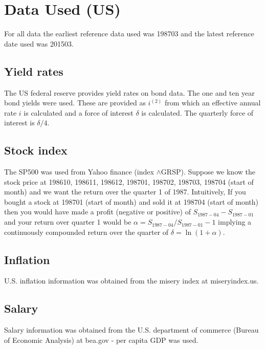 \documentclass[12pt]{article}
\begin{document}


\section{Data Used (US)}

For all data the earliest reference data used was 198703 and the latest
reference date used was 201503. 

\subsection{Yield rates}
The US federal reserve provides yield rates on bond data. The one and ten year
bond yields were used. These are provided as $i^{(2)}$ from which an effective
annual rate $i$ is calculated and a force of interest $\delta$ is calculated.
The quarterly force of interest is $\delta/4$.

\subsection{Stock index}
The SP500 was used from Yahoo finance (index $\wedge$GRSP). Suppose we know the stock price
at 198610, 198611, 198612, 198701, 198702, 198703, 198704 (start of month) and we want the return over the quarter 1 of 1987. Intuitively, If you bought a stock at 198701 (start of month) and sold it at 198704 (start of month) then you would have made a profit (negative or positive) of $S_{1987-04} - S_{1987-01}$ and your return over quarter 1 would be $\alpha = S_{1987-04}/S_{1987-01} - 1$ implying a continuously compounded return over the quarter of $\delta = \ln(1+\alpha)$.

\subsection{Inflation}
U.S. inflation information was obtained from the misery index at miseryindex.us.

\subsection{Salary}
Salary information was obtained from the U.S. department of commerce (Bureau of Economic Analysis) at bea.gov - per capita GDP was used.
\end{document}

